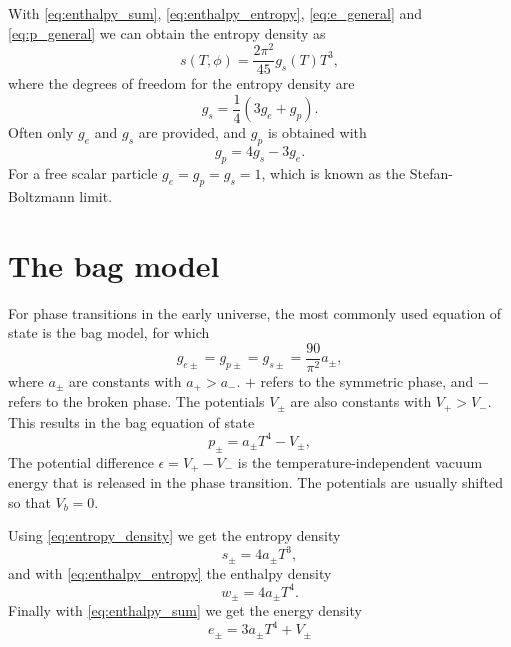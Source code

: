 With \eqref{eq:enthalpy_sum}, \eqref{eq:enthalpy_entropy}, \eqref{eq:e_general} and \eqref{eq:p_general} we can obtain the entropy density as
\cite[eq. S12]{borsanyi_lattice_2016}
\begin{equation}
s(T,\phi) = \frac{2\pi^2}{45} g_s(T) T^3,
\end{equation}
where the degrees of freedom for the entropy density are
\begin{equation}
g_s = \frac{1}{4} (3g_e + g_p).
\end{equation}
Often only $g_e$ and $g_s$ are provided, and $g_p$ is obtained with
\begin{equation}
g_p = 4g_s - 3g_e.
\end{equation}
For a free scalar particle $g_e = g_p = g_s = 1$, which is known as the Stefan-Boltzmann limit.
\iffalse
due to its reminiscence to the Stefan-Boltzmann law $j^* = \sigma T^4$,
which relates the power radiated by a black body to its temperature with the Stefan-Boltzmann constant $\sigma$.
\fi


\section{The bag model}
\label{bag_model}
For phase transitions in the early universe,
the most commonly used equation of state is the bag model, for which
\begin{equation}
g_{e\pm} = g_{p\pm} = g_{s\pm} = \frac{90}{\pi^2} a_\pm,
\end{equation}
where $a_\pm$ are constants with $a_+ > a_-$.
$+$ refers to the symmetric phase, and $-$ refers to the broken phase.
The potentials $V_\pm$ are also constants with $V_+ > V_-$.
This results in the bag equation of state
\cites[eq. 7.33]{lecture_notes}[eq. 8-9]{giese_2020}
\begin{equation}
p_\pm = a_\pm T^4 - V_\pm,
\label{eq:bag_p}
\end{equation}
The potential difference $\epsilon = V_+ - V_-$ is the temperature-independent vacuum energy that is released in the phase transition.
The potentials are usually shifted so that $V_b = 0$.
\cite{giese_2020}

Using \eqref{eq:entropy_density} we get the entropy density
\begin{equation}
s_\pm = 4 a_\pm T^3,
\end{equation}
and with \eqref{eq:enthalpy_entropy} the enthalpy density
\begin{equation}
w_\pm = 4 a_\pm T^4.
\end{equation}
Finally with \eqref{eq:enthalpy_sum} we get the energy density
\begin{equation}
e_\pm = 3 a_\pm T^4 + V_\pm
\end{equation}

